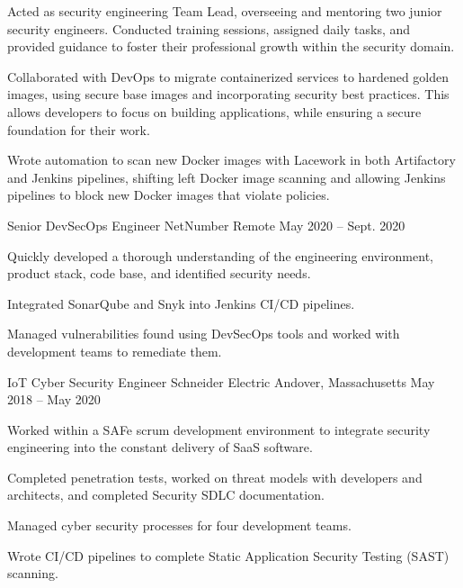 \begin{cventries}
{\begin{cvitems}
{        }
        \item {
          Acted as security engineering Team Lead, overseeing and mentoring two junior security engineers. Conducted training sessions, assigned daily tasks, and provided guidance to foster their professional growth within the security domain.
        }
        \item {
          Collaborated with DevOps to migrate containerized services to hardened golden images, using secure base images and incorporating security best practices. This allows developers to focus on building applications, while ensuring a secure foundation for their work.
        }
        \item {
          Wrote automation to scan new Docker images with Lacework in both Artifactory and Jenkins pipelines, shifting left Docker image scanning and allowing Jenkins pipelines to block new Docker images that violate policies.
        }
      \end{cvitems}
    }

  \cventry
    {Senior DevSecOps Engineer} %
    {NetNumber} %
    {Remote} %
    {May 2020 – Sept. 2020} %
    {
      \begin{cvitems} %
        \item {
          Quickly developed a thorough understanding of the engineering environment, product stack, code base, and identified security needs.
        }
        \item {
          Integrated SonarQube and Snyk into Jenkins CI/CD pipelines.
        }
        \item {
          Managed vulnerabilities found using DevSecOps tools and worked with development teams to remediate them.
        }
      \end{cvitems}
    }

  \cventry
    {IoT Cyber Security Engineer} %
    {Schneider Electric} %
    {Andover, Massachusetts} %
    {May 2018 – May 2020} %
    {
      \begin{cvitems} %
        \item {
          Worked within a SAFe scrum development environment to integrate security engineering into the constant delivery of SaaS software.
        }
        \item {
          Completed penetration tests, worked on threat models with developers and architects, and completed Security SDLC documentation.
        }
        \item {
          Managed cyber security processes for four development teams.
        }
        \item {
          Wrote CI/CD pipelines to complete Static Application Security Testing (SAST) scanning.
        }
      \end{cvitems}
    }


\end{cventries}

